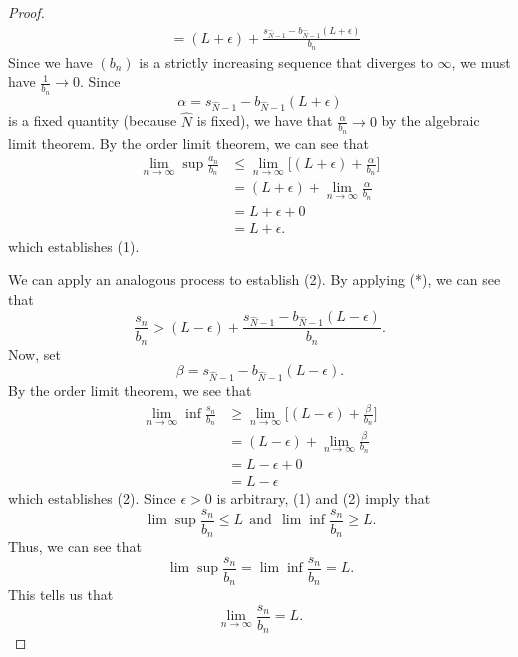 \documentclass[a4paper]{article}
\begin{document}
\begin{proof}
\begin{align*}
    &= (L+\epsilon) +  \frac{ {s}_{\hat{N} -1} -  {b}_{\hat{N} -1} (L+\epsilon) }{ {b}_{n} } 
\end{align*}
Since we have \( ({b}_{n}) \) is a strictly increasing sequence that diverges to \( \infty   \), we must have \( \frac{ 1 }{ {b}_{n} }  \to 0  \). Since 
\[  \alpha = {s}_{\hat{N} - 1} - {b}_{\hat{N} - 1} (L+\epsilon)  \]
is a fixed quantity (because \( \hat{N} \) is fixed), we have that \( \frac{ \alpha }{ {b}_{n} } \to 0  \) by the algebraic limit theorem. By the order limit theorem, we can see that 
\begin{align*}
    \lim_{n \to \infty } \sup \frac{ {a}_{n} }{ {b}_{n} } &\leq  \lim_{ n \to \infty  }  \Big[ (L+\epsilon) + \frac{ \alpha  }{ {b}_{n} } \Big]  \\
                                                          &= (L+\epsilon) + \lim_{ n \to \infty  }  \frac{ \alpha }{ {b}_{n} } \tag{ALT}  \\
                                                          &= L+\epsilon + 0 \\ 
                                                          &= L + \epsilon.
\end{align*}
which establishes (1).

We can apply an analogous process to establish (2). By applying (*), we can see that 
\[ \frac{ {s}_{n} }{ {b}_{n} }  > (L - \epsilon) + \frac{ {s}_{\hat{N} - 1} - {b}_{\hat{N} - 1}(L-\epsilon) }{ {b}_{n} }.  \]
Now, set
\[  \beta = {s}_{\hat{N} - 1} - {b}_{\hat{N} - 1}(L - \epsilon). \]
By the order limit theorem, we see that 
\begin{align*}
    \lim_{ n \to \infty  }  \inf \frac{ {s}_{n} }{ {b}_{n} }  &\geq \lim_{ n \to \infty  }  \Big[ (L-\epsilon) + \frac{\beta}{ {b}_{n} } \Big]  \\
                                                              &= (L-\epsilon) + \lim_{ n \to \infty  }  \frac{ \beta }{ {b}_{n} } \tag{ALT}  \\
                                                              &= L - \epsilon + 0 \\
                                                              &= L - \epsilon
\end{align*} 
which establishes (2). Since \( \epsilon > 0  \) is arbitrary, (1) and (2) imply that 
\[  \lim \sup \frac{ {s}_{n} }{ {b}_{n} }  \leq L \ \ \text{and} \ \ \lim \inf \frac{  {s}_{n} }{ {b}_{n} } \geq L.   \]
Thus, we can see that
\[  \lim \sup \frac{ {s}_{n} }{ {b}_{n} }  = \lim \inf \frac{ {s}_{n} }{ {b}_{n} }  = L.   \]
This tells us that 
\[  \lim_{ n \to \infty  }  \frac{ {s}_{n} }{ {b}_{n} }  = L.  \]



\end{proof}
\end{document}
